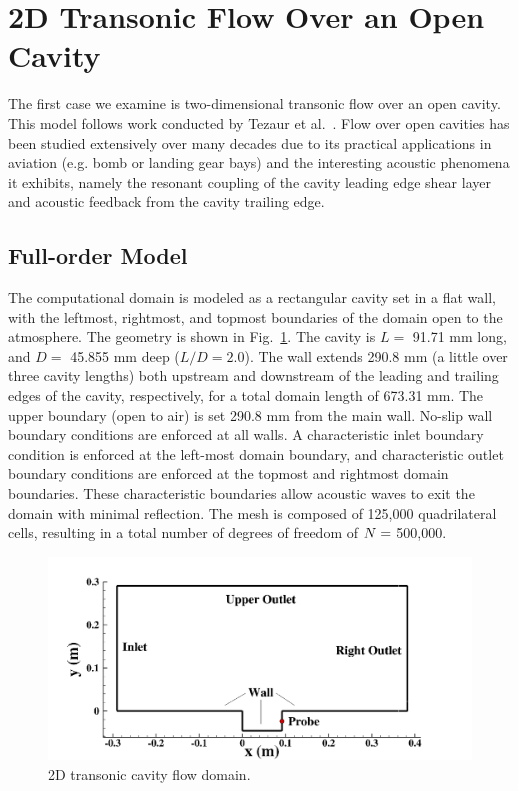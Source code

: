 \section{2D Transonic Flow Over an Open Cavity}\label{sec:cavity}

The first case we examine is two-dimensional transonic flow over an open cavity. This model follows work conducted by Tezaur et al.~\cite{Tezaur2016,Tezaur2017}. Flow over open cavities has been studied extensively over many decades due to its practical applications in aviation (e.g. bomb or landing gear bays) and the interesting acoustic phenomena it exhibits, namely the resonant coupling of the cavity leading edge shear layer and acoustic feedback from the cavity trailing edge.

\subsection{Full-order Model}

The computational domain is modeled as a rectangular cavity set in a flat wall, with the leftmost, rightmost, and topmost boundaries of the domain open to the atmosphere. The geometry is shown in Fig.~\ref{fig:cavityGeom}. The cavity is $L =$ 91.71 mm long, and $D =$ 45.855 mm deep ($L/D = 2.0$). The wall extends 290.8 mm (a little over three cavity lengths) both upstream and downstream of the leading and trailing edges of the cavity, respectively, for a total domain length of 673.31 mm. The upper boundary (open to air) is set 290.8 mm from the main wall. No-slip wall boundary conditions are enforced at all walls. A characteristic inlet boundary condition is enforced at the left-most domain boundary, and characteristic outlet boundary conditions are enforced at the topmost and rightmost domain boundaries. These characteristic boundaries allow acoustic waves to exit the domain with minimal reflection. The mesh is composed of 125,000 quadrilateral cells, resulting in a total number of degrees of freedom of $N =$ 500,000.

\begin{figure}
    \centering
    \includegraphics[width=0.9\linewidth]{Chapters/CavityAndCVRC/Images/cavity/geom.png}
    \caption{\label{fig:cavityGeom}
	2D transonic cavity flow domain.}
\end{figure}

